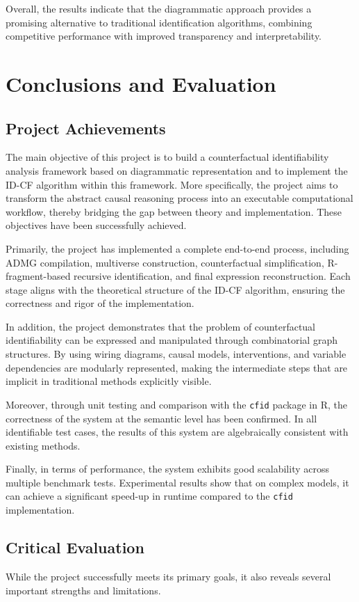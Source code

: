 \documentclass[a4paper]{report}
\begin{document}
Overall, the results indicate that the diagrammatic approach provides a promising alternative to traditional identification algorithms, combining competitive performance with improved transparency and interpretability.

\chapter{Conclusions and Evaluation}
\section{Project Achievements}
The main objective of this project is to build a counterfactual identifiability analysis framework based on diagrammatic representation and to implement the ID-CF algorithm within this framework. More specifically, the project aims to transform the abstract causal reasoning process into an executable computational workflow, thereby bridging the gap between theory and implementation. These objectives have been successfully achieved.

Primarily, the project has implemented a complete end-to-end process, including ADMG compilation, multiverse construction, counterfactual simplification, R-fragment-based recursive identification, and final expression reconstruction. Each stage aligns with the theoretical structure of the ID-CF algorithm, ensuring the correctness and rigor of the implementation.

In addition, the project demonstrates that the problem of counterfactual identifiability can be expressed and manipulated through combinatorial graph structures. By using wiring diagrams, causal models, interventions, and variable dependencies are modularly represented, making the intermediate steps that are implicit in traditional methods explicitly visible.

Moreover, through unit testing and comparison with the 	\texttt{cfid} package in R, the correctness of the system at the semantic level has been confirmed. In all identifiable test cases, the results of this system are algebraically consistent with existing methods.

Finally, in terms of performance, the system exhibits good scalability across multiple benchmark tests. Experimental results show that on complex models, it can achieve a significant speed-up in runtime compared to the \texttt{cfid} implementation.

\section{Critical Evaluation}
While the project successfully meets its primary goals, it also reveals several important strengths and limitations.
\end{document}
